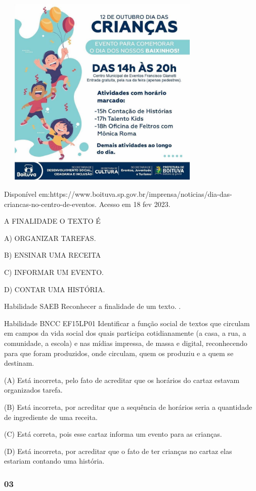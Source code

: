 \includegraphics[width=4.03663in,height=3.60910in]{media/image158.jpg}

Disponível
em:https://www.boituva.sp.gov.br/imprensa/noticias/dia-das-criancas-no-centro-de-eventos.
Acesso em 18 fev 2023.

A FINALIDADE O TEXTO É

A) ORGANIZAR TAREFAS.

B) ENSINAR UMA RECEITA

C) INFORMAR UM EVENTO.

D) CONTAR UMA HISTÓRIA.

Habilidade SAEB Reconhecer a finalidade de um texto. .

Habilidade BNCC EF15LP01 Identificar a função social de textos que
circulam em campos da vida social dos quais participa cotidianamente (a
casa, a rua, a comunidade, a escola) e nas mídias impressa, de massa e
digital, reconhecendo para que foram produzidos, onde circulam, quem os
produziu e a quem se destinam.

(A) Está incorreta, pelo fato de acreditar que os horários do cartaz
estavam organizados tarefa.

(B) Está incorreta, por acreditar que a sequência de horários seria a
quantidade de ingrediente de uma receita.

(C) Está correta, pois esse cartaz informa um evento para as crianças.

(D) Está incorreta, por acreditar que o fato de ter crianças no cartaz
elas estariam contando uma história.

\subsubsection{03 }\label{section-14}

